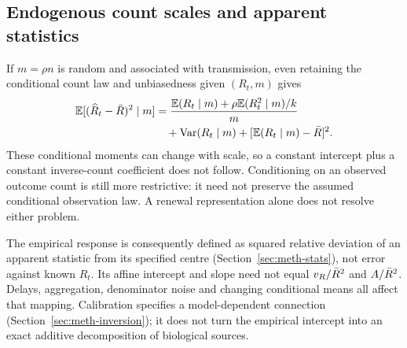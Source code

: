 \subsection{Endogenous count scales and apparent statistics}
\label{sec:bg-scope}

If $m=\rho n$ is random and associated with transmission, even retaining the conditional count law and unbiasedness given $(R_t,m)$ gives
\begin{equation}
\begin{aligned}
 \mathbb{E}[(\widehat R_t-\bar R)^2\mid m]
 &=\frac{\mathbb{E}(R_t\mid m)+\rho\mathbb{E}(R_t^2\mid m)/k}{m}\\
 &\quad+\mathrm{Var}(R_t\mid m)+[\mathbb{E}(R_t\mid m)-\bar R]^2.
\end{aligned}
\label{eq:endogenous-risk}
\end{equation}
These conditional moments can change with scale, so a constant intercept plus a constant inverse-count coefficient does not follow. Conditioning on an observed outcome count is still more restrictive: it need not preserve the assumed conditional observation law. A renewal representation alone does not resolve either problem.

The empirical response is consequently defined as squared relative deviation of an apparent statistic from its specified centre (Section~\ref{sec:meth-stats}), not error against known $R_t$. Its affine intercept and slope need not equal $v_R/\bar R^2$ and $A/\bar R^2$. Delays, aggregation, denominator noise and changing conditional means all affect that mapping. Calibration specifies a model-dependent connection (Section~\ref{sec:meth-inversion}); it does not turn the empirical intercept into an exact additive decomposition of biological sources.
